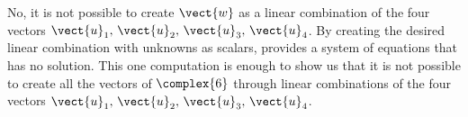 No, it is not possible to create $\vect{w}$ as a linear combination 
of the four vectors $\vect{u}_1,\,\vect{u}_2,\,\vect{u}_3,\,\vect{u}_4$.  By creating the desired linear combination with unknowns as scalars,  provides a system of equations that has no solution.  This one computation is enough to show us that it is not possible to create all the vectors of $\complex{6}$ through linear combinations of the four vectors $\vect{u}_1,\,\vect{u}_2,\,\vect{u}_3,\,\vect{u}_4$.
